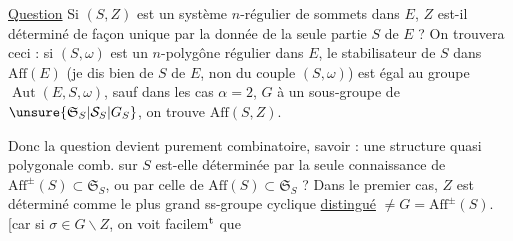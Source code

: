 \uline{Question} Si $(S,Z)$ est un système $n$-régulier de sommets dans $E$, $Z$ est-il déterminé de façon unique par la donnée de la seule partie $S$ de $E$ ? On trouvera ceci : si $(S,\omega)$ est un $n$-polygône régulier dans $E$, le stabilisateur  de $S$ dans $\mathrm{Aff}(E)$ (je dis bien de  $S$ de $E$, non du couple $(S,\omega)$) est égal au groupe $\operatorname{Aut}(E,S,\omega)$, sauf dans les cas $\alpha=2$,   $G$ à un sous-groupe de $\unsure{\mathfrak S_S|\mathcal S_S|G_S}$, on trouve $\mathrm{Aff}(S,Z)$.

Donc la question devient purement combinatoire, savoir : une structure quasi polygonale comb.  sur $S$ est-elle déterminée par la seule connaissance de $\mathrm{Aff}^{\pm}(S)\subset\mathfrak S_S$, ou par celle de $\mathrm{Aff}(S)\subset\mathfrak S_S$ ? Dans le premier cas, $Z$ est déterminé comme le plus grand ss-groupe cyclique \uline{distingué} $\neq G=\mathrm{Aff}^{\pm}(S)$. [car si $\sigma\in G\smallsetminus Z$, on voit facilem$^{\rm t}$ que
